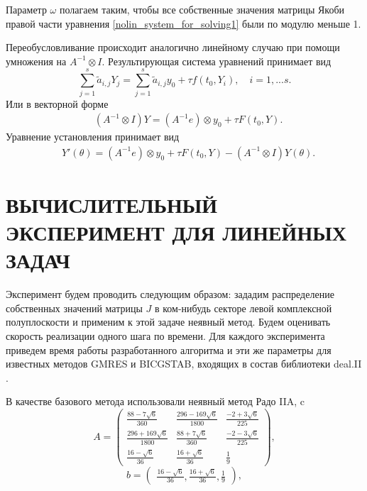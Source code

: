 \documentclass[a4paper, 14pt]{extreport} %
\begin{document}
Параметр $\omega$ полагаем таким, чтобы все собственные значения матрицы Якоби правой части уравнения \eqref{nolin_system_for_solving1} были по модулю меньше 1.

Переобусловливание происходит аналогично линейному случаю при помощи умножения на $A^{-1}\otimes I$. Результирующая система уравнений принимает вид
$$\sum_{j = 1}^s \tilde a_{i,j}Y_j = \sum_{j = 1}^s \tilde a_{i,j} y_0 +\tau f(t_0,Y_i), \quad i = 1,...s.$$
Или в векторной форме
\begin{equation}
\begin{aligned}
\label{nolin_system_for_solving}
&(A^{-1}\otimes I)Y =(A^{-1}e)\otimes y_0 +\tau F(t_0,Y).
\end{aligned}
\end{equation}
Уравнение установления принимает вид
\begin{equation*}
\begin{aligned}
&Y'(\theta) =(A^{-1}e)\otimes y_0 +\tau F(t_0,Y)-(A^{-1}\otimes I)Y(\theta).
\end{aligned}
\end{equation*}



\chapter{ВЫЧИСЛИТЕЛЬНЫЙ ЭКСПЕРИМЕНТ ДЛЯ ЛИНЕЙНЫХ ЗАДАЧ}

Эксперимент будем проводить следующим образом: зададим распределение
собственных значений матрицы $J$ в ком-нибудь секторе левой
комплексной полуплоскости и применим к этой задаче неявный метод.
Будем оценивать скорость реализации одного шага по времени. Для
каждого эксперимента приведем время работы разработанного алгоритма
и эти же параметры для известных методов GMRES и BICGSTAB, входящих
в состав библиотеки deal.II \cite{deal}.

 В качестве базового метода использовали неявный метод Радо IIA, c
$$A=\left(
\begin{array}{lll}
 \frac{88-7\sqrt{6}}{360} & \frac{296-169\sqrt{6}}{1800} & \frac{-2+3\sqrt{6}}{225} \\
 \frac{296+169\sqrt{6}}{1800} & \frac{88+7\sqrt{6}}{360} & \frac{-2-3\sqrt{6}}{225} \\
 \frac{16-\sqrt{6}}{36} &\frac{16+\sqrt{6}}{36} & \frac{1}{9}
\end{array}
\right),$$
$$b=\left(
\begin{array}{l}
\frac{16-\sqrt{6}}{36},\frac{16+\sqrt{6}}{36},\frac{1}{9}
\end{array}
\right),$$
\end{document}
